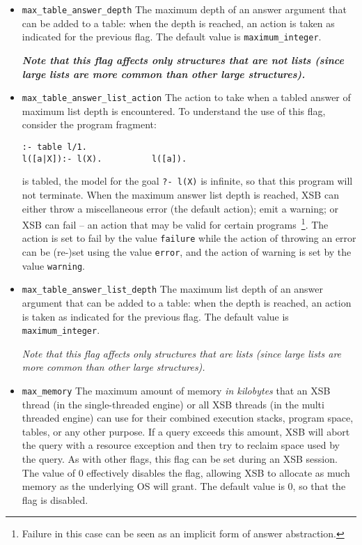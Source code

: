 \begin{description}
\begin{itemize}
\item {\tt max\_table\_answer\_depth} The maximum depth of an answer
  argument that can be added to a table: when the depth is reached, an
  action is taken as indicated for the previous flag.  The default
  value is {\tt maximum\_integer}.

{\bf  {\em Note that this flag affects only structures that are not lists
    (since large lists are more common than other large structures).
  }}

\item {\tt max\_table\_answer\_list\_action} The action to take when a
  tabled answer of maximum list depth is encountered.  To understand
  the use of this flag, consider the program fragment:
\begin{verbatim}
:- table l/1.
l([a|X]):- l(X).          l([a]).
\end{verbatim}
  is tabled, the model for the goal {\tt ?- l(X)} is infinite, so that
  this program will not terminate.  When the maximum answer list depth
  is reached, XSB can either throw a miscellaneous error (the default
  action); emit a warning; or XSB can fail -- an action that may be
  valid for certain programs~\footnote{Failure in this case can be
    seen as an implicit form of answer abstraction.}.  The action is
  set to fail by the value {\tt failure} while the action of throwing
  an error can be (re-)set using the value {\tt error}, and the action
  of warning is set by the value {\tt warning}.

\item {\tt max\_table\_answer\_list\_depth} The maximum list depth of
  an answer argument that can be added to a table: when the depth is
  reached, an action is taken as indicated for the previous flag.  The
  default value is {\tt maximum\_integer}.

  {\em Note that this flag affects only structures that are lists
    (since large lists are more common than other large structures).
  }

\item {\tt max\_memory} The maximum amount of memory {\em in
  kilobytes} that an XSB thread (in the single-threaded engine) or all
  XSB threads (in the multi threaded engine) can use for their
  combined execution stacks, program space, tables, or any other
  purpose.  If a query exceeds this amount, XSB will abort the query
  with a resource exception and then try to reclaim space used by the
  query.  As with other flags, this flag can be set during an XSB
  session.  The value of 0 effectively disables the flag, allowing XSB
  to allocate as much memory as the underlying OS will grant.  The
  default value is 0, so that the flag is disabled.


\end{itemize}
\end{description}
